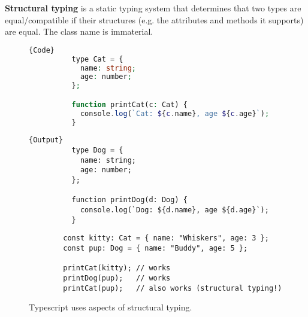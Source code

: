   \begin{definition}
    \textbf{Structural typing} is a static typing system that determines that two types are equal/compatible if their structures (e.g. the attributes and methods it supports) are equal. The class name is immaterial. 

    \begin{figure}[H]
      \centering 
      \noindent\begin{minipage}{.5\textwidth}
        \begin{lstlisting}[language=php]{Code}
          type Cat = {
            name: string;
            age: number;
          };

          function printCat(c: Cat) {
            console.log(`Cat: ${c.name}, age ${c.age}`);
          }
        \end{lstlisting}
        \end{minipage}
        \hfill
        \begin{minipage}{.49\textwidth}
        \begin{lstlisting}[]{Output}
          type Dog = {
            name: string;
            age: number;
          };

          function printDog(d: Dog) {
            console.log(`Dog: ${d.name}, age ${d.age}`);
          }
        \end{lstlisting}
      \end{minipage}

      \begin{lstlisting}
        const kitty: Cat = { name: "Whiskers", age: 3 };
        const pup: Dog = { name: "Buddy", age: 5 };

        printCat(kitty); // works
        printDog(pup);   // works
        printCat(pup);   // also works (structural typing!)
      \end{lstlisting}
      \caption{Typescript uses aspects of structural typing.} 
      \label{fig:typescript_structural}
    \end{figure}
  \end{definition}

